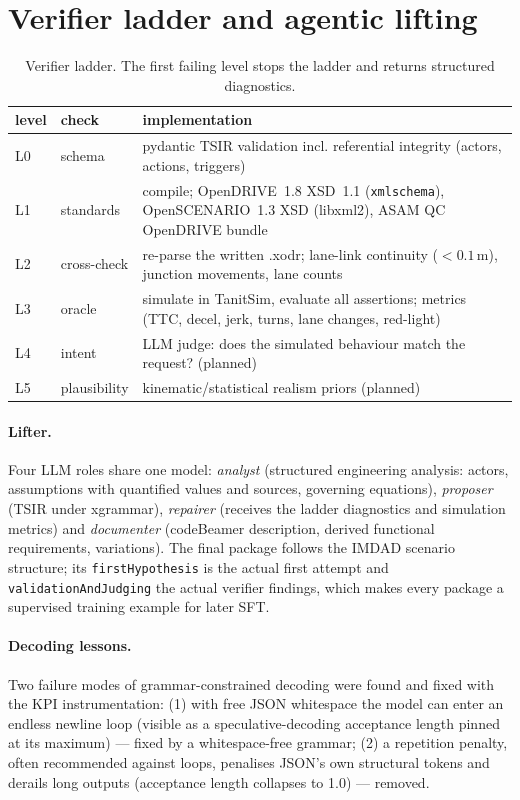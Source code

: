 \documentclass[10pt,a4paper]{article}
\begin{document}
\section{Verifier ladder and agentic lifting}
\begin{table}[h]\centering\small
\caption{Verifier ladder. The first failing level stops the ladder and returns structured diagnostics.}\label{tab:ladder}
\begin{tabularx}{\linewidth}{@{}l l X@{}}\toprule
level & check & implementation \\\midrule
L0 & schema & pydantic TSIR validation incl. referential integrity (actors, actions, triggers) \\
L1 & standards & compile; OpenDRIVE~1.8 XSD~1.1 (\texttt{xmlschema}), OpenSCENARIO~1.3 XSD (libxml2), ASAM QC OpenDRIVE bundle \\
L2 & cross-check & re-parse the written .xodr; lane-link continuity ($<0.1$\,m), junction movements, lane counts \\
L3 & oracle & simulate in TanitSim, evaluate all assertions; metrics (TTC, decel, jerk, turns, lane changes, red-light) \\
L4 & intent & LLM judge: does the simulated behaviour match the request? (planned) \\
L5 & plausibility & kinematic/statistical realism priors (planned) \\\bottomrule
\end{tabularx}
\end{table}

\paragraph{Lifter.} Four LLM roles share one model: \emph{analyst} (structured engineering analysis: actors,
assumptions with quantified values and sources, governing equations), \emph{proposer} (TSIR under xgrammar),
\emph{repairer} (receives the ladder diagnostics and simulation metrics) and \emph{documenter} (codeBeamer
description, derived functional requirements, variations). The final package follows the IMDAD scenario
structure; its \texttt{firstHypothesis} is the actual first attempt and \texttt{validationAndJudging} the
actual verifier findings, which makes every package a supervised training example for later SFT.

\paragraph{Decoding lessons.} Two failure modes of grammar-constrained decoding were found and fixed with the
KPI instrumentation: (1) with free JSON whitespace the model can enter an endless newline loop (visible as a
speculative-decoding acceptance length pinned at its maximum) --- fixed by a whitespace-free grammar;
(2) a repetition penalty, often recommended against loops, penalises JSON's own structural tokens and
derails long outputs (acceptance length collapses to 1.0) --- removed.
\end{document}
